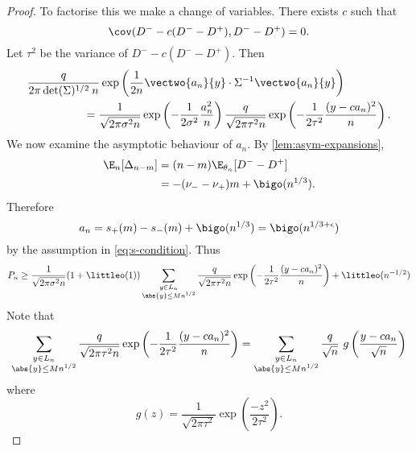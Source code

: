 \begin{proof}
    To factorise this we make a change of variables. There exists $c$ such that
    \begin{equation*}
        \cov(D^- - c(D^- - D^+), D^- - D^+) = 0.
    \end{equation*}
    Let $\tau^2$ be the variance of $D^- - c(D^- - D^+)$. Then
    \begin{align*}
         &\frac{q}{2\pi \det(\Sigma)^{1/2} \: n} \exp\left( 
            \frac{1}{2n} \vectwo{a_n}{y} \cdot \Sigma^{-1} \vectwo{a_n}{y}
         \right) \nonumber \\
         & \hspace{5em} =
         \frac{1}{\sqrt{2 \pi \sigma^2 n}} \exp \left( - \frac{1}{2 \sigma^2} \frac{a_n^2}{n} \right)
         \frac{q}{\sqrt{2 \pi \tau^2 n}} \exp \left( - \frac{1}{2 \tau^2} \frac{(y - ca_n)^2}{n} \right).
    \end{align*}
    We now examine the asymptotic behaviour of $a_n$. By \cref{lem:asym-expansions},
    \begin{align*}
        \E_n[\Delta_{n-m}]
        &= (n - m) \E_{\theta_n}[D^- - D^+] \\ 
        &= -(\nu_- - \nu_+)m + \bigo(n^{1/3}).
    \end{align*}
    Therefore 
    \begin{equation*}
        a_n = s_+(m) - s_-(m) + \bigo(n^{1/3}) = \bigo(n^{1/3 + \epsilon})
    \end{equation*}
    by the assumption in \cref{eq:s-condition}. Thus
    \begin{equation*}
        P_n \geq
        \frac{1}{\sqrt{2 \pi \sigma^2 n}}(1 + \littleo(1))
        \sum_{\substack{y \in L_n \\ \abs{y} \leq M n^{1/2}}}
        \frac{q}{\sqrt{2 \pi \tau^2 n}} \exp \left( - \frac{1}{2 \tau^2} \frac{(y - ca_n)^2}{n} \right)
        + \littleo(n^{-1/2})
    \end{equation*}
    Note that
    \begin{equation*}
        \sum_{\substack{y \in L_n \\ \abs{y} \leq M n^{1/2}}}
        \frac{q}{\sqrt{2 \pi \tau^2 n}} \exp \left( - \frac{1}{2 \tau^2} \frac{(y - ca_n)^2}{n} \right)
        = \sum_{\substack{y \in L_n \\ \abs{y} \leq M n^{1/2}}}
        \frac{q}{\sqrt{n}}\ g\left( \frac{y - ca_n}{\sqrt{n}} \right)
    \end{equation*}
    where
    \begin{equation*}
        g(z) = \frac{1}{\sqrt{2 \pi \tau^2}} \exp\left( \frac{-z^2}{2 \tau^2} \right).

\end{equation*}
\end{proof}
